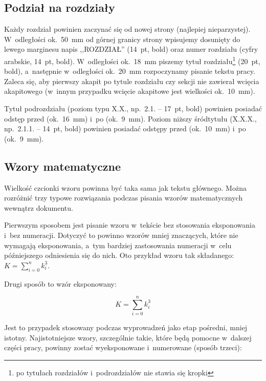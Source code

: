 \documentclass[skorowidz,skroty]{dyplomWEZUT}
\begin{document}
\subsection{Podział na rozdziały}

Każdy rozdział powinien zaczynać się od nowej strony (najlepiej nieparzystej). W~odległości ok.~50~mm od górnej granicy strony wpisujemy dosunięty do lewego marginesu napis ,,ROZDZIAŁ'' (14~pt, bold) oraz numer rozdziału (cyfry arabskie, 14~pt, bold). W~odległości ok.~18~mm piszemy tytuł rozdziału\footnote{po tytułach rozdziałów i~podrozdziałów nie stawia się kropki} (20~pt, bold), a~następnie w~odległości ok.~20~mm rozpoczynamy pisanie tekstu pracy. Zaleca się, aby pierwszy akapit po tytule rozdziału czy sekcji nie zawierał wcięcia akapitowego (w~innym przypadku wcięcie akapitowe jest wielkości ok.~10~mm).

Tytuł podrozdziału (poziom typu X.X., np.~2.1. -- 17~pt, bold) powinien posiadać odstęp przed (ok.~16~mm) i~po (ok.~9~mm). Poziom niższy śródtytułu (X.X.X., np.~2.1.1. -- 14~pt, bold) powinien posiadać odstępy przed (ok.~10~mm) i~po (ok.~9~mm).

\subsection{Wzory matematyczne}\label{subsec:equations}

Wielkość czcionki wzoru powinna być taka sama jak tekstu głównego. Można rozróżnić trzy typowe rozwiązania podczas pisania wzorów matematycznych wewnątrz dokumentu.

Pierwszym sposobem jest pisanie wzoru w~tekście bez stosowania eksponowania i~bez numeracji. Dotyczyć to powinno wzorów mniej znaczących, które nie wymagają eksponowania, a~tym bardziej zastosowania numeracji w~celu późniejszego odniesienia się do nich. Oto przykład wzoru tak składanego: $K=\sum_{i=0}^n k_{i}^{3}$.

Drugi sposób to wzór eksponowany:

$$K=\sum_{i=0}^n k_{i}^{3}$$

Jest to przypadek stosowany podczas wyprowadzeń jako etap pośredni, mniej istotny. Najistotniejsze wzory, szczególnie takie, które będą pomocne w~dalszej części pracy, powinny zostać wyeksponowane i~numerowane (sposób trzeci):

\end{document}
